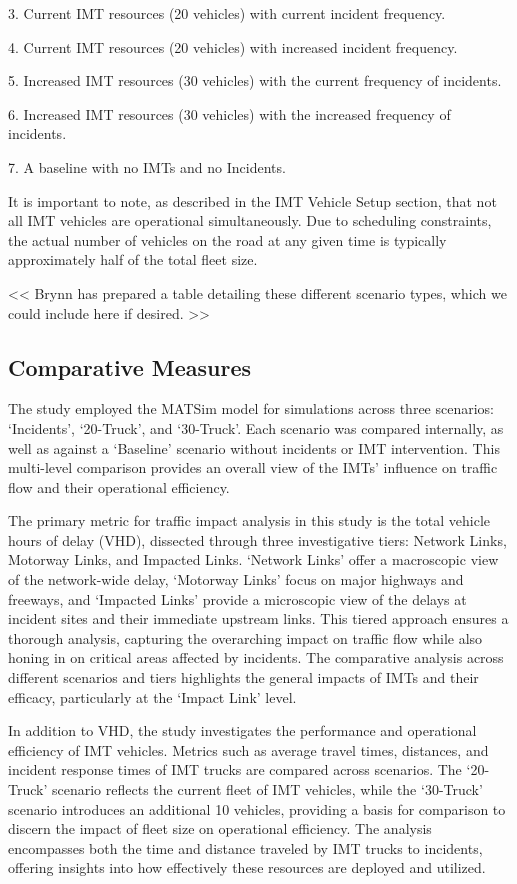 \documentclass[fancy, oneside, mastersfancy, ms]{byuthesis}
\begin{document}
3. Current IMT resources (20 vehicles) with current incident frequency.

4. Current IMT resources (20 vehicles) with increased incident
frequency.

5. Increased IMT resources (30 vehicles) with the current frequency of
incidents.

6. Increased IMT resources (30 vehicles) with the increased frequency of
incidents.

7. A baseline with no IMTs and no Incidents.

It is important to note, as described in the IMT Vehicle Setup section,
that not all IMT vehicles are operational simultaneously. Due to
scheduling constraints, the actual number of vehicles on the road at any
given time is typically approximately half of the total fleet size.

\textless\textless{} Brynn has prepared a table detailing these
different scenario types, which we could include here if desired.
\textgreater\textgreater{}

\hypertarget{comparative-measures}{%
\subsection{Comparative Measures}\label{comparative-measures}}

The study employed the MATSim model for simulations across three
scenarios: `Incidents', `20-Truck', and `30-Truck'. Each scenario was
compared internally, as well as against a `Baseline' scenario without
incidents or IMT intervention. This multi-level comparison provides an
overall view of the IMTs' influence on traffic flow and their
operational efficiency.

The primary metric for traffic impact analysis in this study is the
total vehicle hours of delay (VHD), dissected through three
investigative tiers: Network Links, Motorway Links, and Impacted Links.
`Network Links' offer a macroscopic view of the network-wide delay,
`Motorway Links' focus on major highways and freeways, and `Impacted
Links' provide a microscopic view of the delays at incident sites and
their immediate upstream links. This tiered approach ensures a thorough
analysis, capturing the overarching impact on traffic flow while also
honing in on critical areas affected by incidents. The comparative
analysis across different scenarios and tiers highlights the general
impacts of IMTs and their efficacy, particularly at the `Impact Link'
level.

In addition to VHD, the study investigates the performance and
operational efficiency of IMT vehicles. Metrics such as average travel
times, distances, and incident response times of IMT trucks are compared
across scenarios. The `20-Truck' scenario reflects the current fleet of
IMT vehicles, while the `30-Truck' scenario introduces an additional 10
vehicles, providing a basis for comparison to discern the impact of
fleet size on operational efficiency. The analysis encompasses both the
time and distance traveled by IMT trucks to incidents, offering insights
into how effectively these resources are deployed and utilized.
\end{document}
